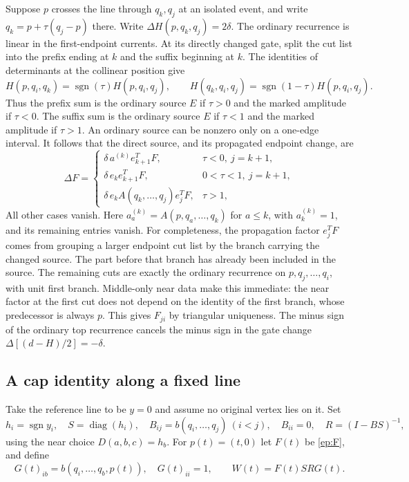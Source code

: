 \documentclass[11pt,letterpaper]{article}
\numberwithin{equation}{section}
\theoremstyle{definition}
\theoremstyle{remark}
\DeclareMathOperator{\sgn}{sgn}
\begin{document}
Suppose $p$ crosses the line through $q_k,q_j$ at an isolated event, and
write $q_k=p+\tau(q_j-p)$ there.  Write
$\Delta H(p,q_k,q_j)=2\delta$.  The ordinary recurrence is linear in
the first-endpoint currents.  At its directly changed gate, split the cut
list into the prefix ending at $k$ and the suffix beginning at $k$.
The identities of determinants at the collinear position give
\begin{equation}
 H(p,q_i,q_k)=\sgn(\tau)H(p,q_i,q_j),\qquad
 H(q_k,q_i,q_j)=\sgn(1-\tau)H(p,q_i,q_j).
 \label{ep:collinear-far-identities}
\end{equation}
Thus the prefix sum is the ordinary source $E$ if $\tau>0$ and the
marked amplitude if $\tau<0$.  The suffix sum is the ordinary source
$E$ if $\tau<1$ and the marked amplitude if $\tau>1$.  An ordinary
source can be nonzero only on a one-edge interval.  It follows that the
direct source, and its propagated endpoint change, are
\begin{equation}
 \Delta F=
 \begin{cases}
 \delta\,a^{(k)}e_{k+1}^{T}F,&\tau<0,\ j=k+1,\\
 \delta\,e_k e_{k+1}^{T}F,&0<\tau<1,\ j=k+1,\\
 \delta\,e_k A(q_k,\ldots,q_j)e_j^{T}F,&\tau>1,
 \end{cases}
 \label{ep:three-endpoint-events}
\end{equation}
All other cases vanish.  Here $a^{(k)}_a=A(p,q_a,\ldots,q_k)$ for
$a\leq k$, with $a^{(k)}_k=1$, and its remaining entries vanish.
For completeness, the propagation factor $e_j^TF$ comes from grouping a
larger endpoint cut list by the branch carrying the changed source.  The
part before that branch has already been included in the source.  The
remaining cuts are exactly the ordinary recurrence on
$p,q_j,\ldots,q_i$, with unit first branch.  Middle-only near data
make this immediate: the near factor at the first cut does not depend on
the identity of the first branch, whose predecessor is always $p$.  This
gives $F_{ji}$ by triangular uniqueness.  The minus sign of the ordinary top recurrence cancels the
minus sign in the gate change $\Delta[(d-H)/2]=-\delta$.

\subsection{A cap identity along a fixed line}
\label{ep:line-caps}

Take the reference line to be $y=0$ and assume no original vertex lies on
it.  Set
\begin{equation}
 h_i=\sgn y_i,\quad S=\operatorname{diag}(h_i),\quad
 B_{ij}=b(q_i,\ldots,q_j)\ (i<j),\quad B_{ii}=0,\quad R=(I-BS)^{-1},
 \label{ep:line-data}
\end{equation}
using the near choice $D(a,b,c)=h_b$.  For $p(t)=(t,0)$ let
$F(t)$ be \eqref{ep:F}, and define
\begin{equation}
 G(t)_{ib}=b(q_i,\ldots,q_b,p(t)),\quad G(t)_{ii}=1,
 \qquad W(t)=F(t)SRG(t).
 \label{ep:G-W}
\end{equation}
\end{document}
